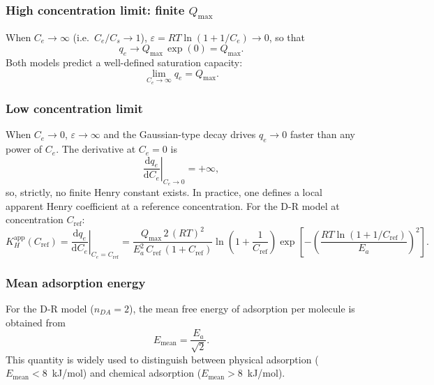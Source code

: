 \documentclass[12pt]{article}
\begin{document}
	\subsubsection{High concentration limit: finite $Q_{\max}$}

	When $C_e \to \infty$ (i.e.\ $C_e/C_s \to 1$),
	$\varepsilon = RT\ln(1 + 1/C_e) \to 0$, so that
	\begin{equation}
		q_e \to Q_{\max}\,\exp(0) = Q_{\max}.
	\end{equation}
	Both models predict a well-defined saturation capacity:
	\begin{equation}
		\boxed{\lim_{C_e \to \infty} q_e = Q_{\max}.}
	\end{equation}

	\subsubsection{Low concentration limit}

	When $C_e \to 0$, $\varepsilon \to \infty$ and the Gaussian-type
	decay drives $q_e \to 0$ faster than any power of $C_e$.  The
	derivative at $C_e = 0$ is
	\begin{equation}
		\left.\frac{\mathrm{d}q_e}{\mathrm{d}C_e}\right|_{C_e \to 0}
		= +\infty,
	\end{equation}
	so, strictly, no finite Henry constant exists.  In practice, one
	defines a local apparent Henry coefficient at a reference
	concentration.  For the D-R model at concentration $C_{\mathrm{ref}}$:
	\begin{equation}
		K_H^{\mathrm{app}}(C_{\mathrm{ref}})
		= \left.\frac{\mathrm{d}q_e}{\mathrm{d}C_e}
		\right|_{C_e = C_{\mathrm{ref}}}
		= \frac{Q_{\max}\,2\,(RT)^2}
		{E_a^2\, C_{\mathrm{ref}}\,(1 + C_{\mathrm{ref}})}
		\ln\!\left(1 + \frac{1}{C_{\mathrm{ref}}}\right)
		\exp\!\left[-\left(
		\frac{RT\ln(1 + 1/C_{\mathrm{ref}})}{E_a}
		\right)^{\!2}\right].
	\end{equation}

	\subsubsection{Mean adsorption energy}

	For the D-R model ($n_{DA} = 2$), the mean free energy of
	adsorption per molecule is obtained from
	\begin{equation}
		\boxed{E_{\mathrm{mean}} = \frac{E_a}{\sqrt{2}}.}
	\end{equation}
	This quantity is widely used to distinguish between physical
	adsorption ($E_{\mathrm{mean}} < 8$~kJ/mol) and chemical
	adsorption ($E_{\mathrm{mean}} > 8$~kJ/mol).
\end{document}
